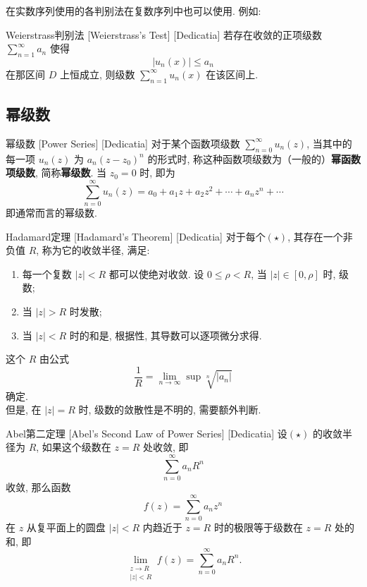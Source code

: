 \documentclass[UTF8]{ctexart}
\begin{document}
        在实数序列使用的各判别法在复数序列中也可以使用. 例如:

        \begin{thm}
            [UUID]
            {Weierstrass判别法}
            [Weierstrass's Test]
            [Dedicatia]
            若存在收敛的正项级数 \(\sum_{n = 1}^{\infty} a_n \) 使得\[|u_n(x)|\leqslant a_n\]
            在那区间 \(D\) 上恒成立, 则级数 \(\sum_{n = 1}^{\infty} u_n(x) \) 在该区间上\UniformConvergence. 
        \end{thm}
    
    \subsection{幂级数}

        \begin{dfn}
            [PowerSeries]
            {幂级数}
            [Power Series]
            [Dedicatia]
            对于某个函数项级数 \(\sum_{n = 0}^{\infty} u_n(z) \), 当其中的每一项 \(u_n(z)\) 为 \(a_n(z-z_0)^n\) 的形式时, 称这种函数项级数为（一般的）\textbf{幂函数项级数}, 简称\textbf{幂级数}. 当 \(z_0=0\) 时, 即为
            \[\sum_{n = 0}^{\infty} u_n(z)=a_0+a_1z+a_2z^2+\cdots+a_nz^n+\cdots \tag{ \(\star\) }\]
            即通常而言的幂级数. 
        \end{dfn}

        \begin{thm}
            [UUID]
            {Hadamard定理}
            [Hadamard's Theorem]
            [Dedicatia]
            对于每个\PowerSeries  \((\star)\), 其存在一个非负值 \(R\), 称为它的收敛半径, 满足: 
            \begin{enumerate}
                \item 每一个复数 \(|z|<R\) 都可以使\PowerSeries 绝对收敛. 设 \(0\leqslant\rho <R\), 当 \(|z|\in[0,\rho]\) 时, 级数\UniformConvergence; 
                \item 当 \(|z|>R\) 时\PowerSeries 发散; 
                \item 当 \(|z|<R\) 时的和是, 根据\UniformConvergence 性, 其导数可以逐项微分求得. 
            \end{enumerate}
            这个 \(R\) 由公式
            \[\frac{1}{R}=\lim_{n\to \infty}\sup\sqrt[n]{|a_n|}\]
            确定. \\
            但是, 在 \(|z|=R\) 时, 级数的敛散性是不明的, 需要额外判断. 
        \end{thm}

        \begin{thm}
            [UUID]
            {Abel第二定理}
            [Abel's Second Law of Power Series]
            [Dedicatia]
            设\PowerSeries  \((\star)\) 的收敛半径为 \(R\), 如果这个级数在 \(z = R\) 处收敛, 即
            \[\sum_{n=0}^{\infty} a_n R^n\]
            收敛, 那么函数
            \[f(z) = \sum_{n=0}^{\infty} a_n z^n\]
            在 \(z\) 从复平面上的圆盘 \(|z| < R\) 内趋近于 \(z = R\) 时的极限等于级数在 \(z = R\) 处的和, 即
            \[\lim_{\substack{z \to R \\ |z| < R}} f(z) = \sum_{n=0}^{\infty} a_n R^n.\]
        \end{thm}
\end{document}
